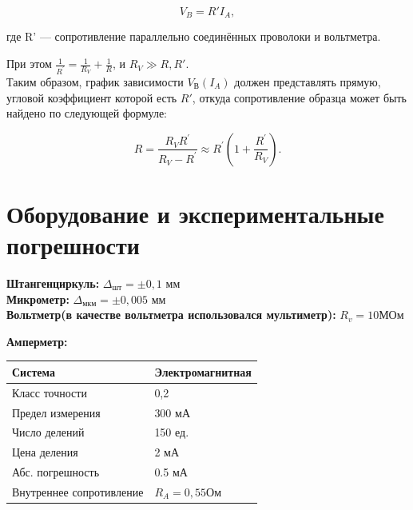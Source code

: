 \documentclass[a4paper,12pt]{article} %
\begin{document}
\[V_B = R'I_A,\]

где R' — сопротивление параллельно соединённых проволоки и вольтметра.

\medskip

При этом $\frac{1}{R^\prime} = \frac{1}{R_V} + \frac{1}{R}$, и $R_V \gg R, R'$.\\

Таким образом, график зависимости $V_\text{В}\left(I_A\right)$ должен представлять прямую, угловой коэффициент которой есть $R'$, откуда сопротивление образца может быть найдено по следующей формуле:


\[R = \dfrac{R_V R^\prime}{R_V - R^\prime} \approx R^\prime \left( 1 + \frac{R^\prime}{R_V} \right).\]

\section{Оборудование и экспериментальные погрешности}

\textbf{Штангенциркуль:} $\Delta_\text{шт} = \pm 0,1$ мм \\
\textbf{Микрометр:} $\Delta_\text{мкм} = \pm 0,005$ мм \\
\textbf{Вольтметр(в качестве вольтметра использовался мультиметр):} $R_v=10$МОм

\noindent \textbf{Амперметр:}

\begin{tabular}{|l|l|}
	\hline
	Система&Электромагнитная \\
	\hline
	Класс точности &0,2 \\
	\hline
	Предел измерения&300 мА\\
	\hline
	Число делений& 150 ед. \\
	\hline
	Цена деления&2 мА \\
	\hline
	Абс. погрешность &0.5 мА \\
	\hline
	Внутреннее сопротивление& $R_A = 0,55 $Ом \\
	\hline
\end{tabular}\\

\medskip


\end{document}
